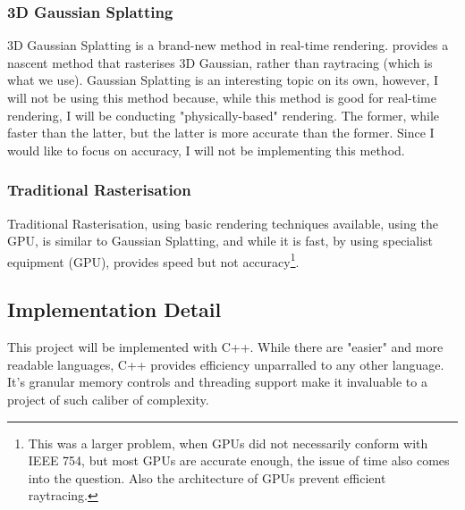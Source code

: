 \documentclass[../main.tex]{subfiles}
\begin{document}
\subsubsection{3D Gaussian Splatting}
3D Gaussian Splatting is a brand-new method in real-time rendering.\cite{kerbl3DGaussianSplatting2023} provides a nascent method that rasterises 3D Gaussian, rather than raytracing (which is what we use). Gaussian Splatting is an interesting topic on its own, however, I will not be using this method because, while this method is good for real-time rendering, I will be conducting "physically-based" rendering. The former, while faster than the latter, but the latter is more accurate than the former. Since I would like to focus on accuracy, I will not be implementing this method.
\subsubsection{Traditional Rasterisation}
Traditional Rasterisation, using basic rendering techniques available, using the GPU, is similar to Gaussian Splatting, and while it is fast, by using specialist equipment (GPU), provides speed but not accuracy\footnote{This was a larger problem, when GPUs did not necessarily conform with IEEE 754, but most GPUs are accurate enough, the issue of time also comes into the question. Also the architecture of GPUs prevent efficient raytracing.}. 

\subsection{Implementation Detail}
This project will be implemented with C++. While there are "easier" and more readable languages, C++ provides efficiency unparralled to any other language. It's granular memory controls and threading support make it invaluable to a project of such caliber of complexity. 
\end{document}
